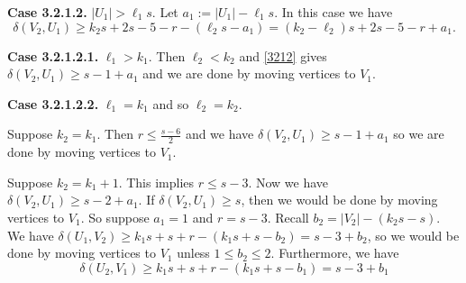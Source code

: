 \documentclass[oneside,12pt]{memoir}
\begin{document}
\textbf{Case 3.2.1.2.} $|U_1|>\ell_1s$.  Let $a_1:=|U_1|-\ell_1s$.  In this case we have 
\begin{equation}\label{3212}
\delta(V_2, U_1)\geq k_2s+2s-5-r-(\ell_2s-a_1)=(k_2-\ell_2)s+2s-5-r+a_1.
\end{equation}

\textbf{Case 3.2.1.2.1.} $\ell_1>k_1$. Then $\ell_2<k_2$ and \eqref{3212} gives $\delta(V_2, U_1)\geq s-1+a_1$ and we are done by moving vertices to $V_1$. 

\textbf{Case 3.2.1.2.2.} $\ell_1=k_1$ and so $\ell_2=k_2$.  

Suppose $k_2=k_1$. Then $r\leq \frac{s-6}{2}$ and we have $\delta(V_2, U_1)\geq s-1+a_1$ so we are done by moving vertices to $V_1$.

Suppose $k_2=k_1+1$. This implies $r\leq s-3$. Now we have 
$\delta(V_2, U_1)\geq s-2+a_1$.  
If $\delta(V_2, U_1)\geq s$, then we would be done by moving vertices to $V_1$. So suppose $a_1=1$ and $r=s-3$. Recall $b_2=|V_2|-(k_2s-s)$.  We have 
$\delta(U_1, V_2)\geq k_1s+s+r-(k_1s+s-b_2)=s-3+b_2$, 
so we would be done by moving vertices to $V_1$ unless $1\leq b_2\leq 2$.  Furthermore, we have 
\begin{equation}\label{s-3+b1}
\delta(U_2, V_1)\geq k_1s+s+r-(k_1s+s-b_1)=s-3+b_1
\end{equation}
\end{document}
